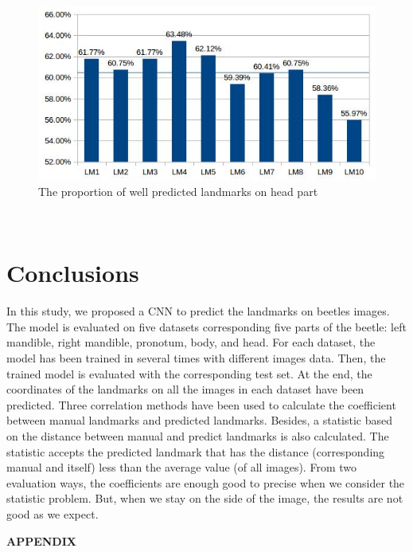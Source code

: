 \documentclass[12pt,a4paper]{article}
\begin{document}
\begin{figure}[h!]
	\centering
	\includegraphics[scale=0.65]{images/tete}
	\caption{The proportion of well predicted landmarks on head part}
	\label{tetefig}
\end{figure}~\\

\section{Conclusions}
In this study, we proposed a CNN to predict the landmarks on beetles images. The model is evaluated on five datasets corresponding five parts of the beetle: left mandible, right mandible, pronotum, body, and head. For each dataset, the model has been trained in several times with different images data. Then, the trained model is evaluated with the corresponding test set. At the end, the coordinates of the landmarks on all the images in each dataset have been predicted. Three correlation methods have been used to calculate the coefficient between manual landmarks and predicted landmarks. Besides, a statistic based on the distance between manual and predict landmarks is also calculated. The statistic accepts the predicted landmark that has the distance (corresponding manual and itself) less than the average value (of all images). From two evaluation ways, the coefficients are enough good to precise when we consider the statistic problem. But, when we stay on the side of the image, the results are not good as we expect.


\pagebreak
\appendix
\begin{center}
\textbf{\LARGE{APPENDIX}}
\end{center}
\end{document}
